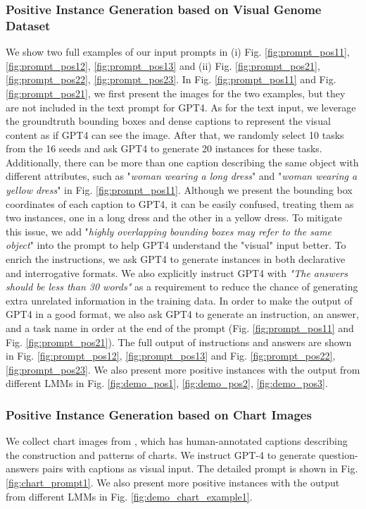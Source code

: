 \subsubsection{Positive Instance Generation based on Visual Genome Dataset}
We show two full examples of our input prompts in (i) Fig. \ref{fig:prompt_pos11}, \ref{fig:prompt_pos12}, \ref{fig:prompt_pos13} and (ii) Fig. \ref{fig:prompt_pos21}, \ref{fig:prompt_pos22}, \ref{fig:prompt_pos23}. In Fig. \ref{fig:prompt_pos11} and Fig. \ref{fig:prompt_pos21}, we first present the images for the two examples, but they are not included in the text prompt for GPT4. As for the text input, we leverage the groundtruth bounding boxes and dense captions to represent the visual content as if GPT4 can see the image. After that, we randomly select 10 tasks from the 16 seeds and ask GPT4 to generate 20 instances for these tasks. Additionally, there can be more than one caption describing the same object with different attributes, such as "\textit{woman wearing a long dress}" and "\textit{woman wearing a yellow dress}" in Fig. \ref{fig:prompt_pos11}. Although we present the bounding box coordinates of each caption to GPT4, it can be easily confused, treating them as two instances, one in a long dress and the other in a yellow dress. To mitigate this issue, we add "\textit{highly overlapping bounding boxes may refer to the same object}" into the prompt to help GPT4 understand the "visual" input better. To enrich the instructions, we ask GPT4 to generate instances in both declarative and interrogative formats. We also explicitly instruct GPT4 with \textit{"The answers should be less than 30 words"} as a requirement to reduce the chance of generating extra unrelated information in the training data. In order to make the output of GPT4 in a good format, we also ask GPT4 to generate an instruction, an answer, and a task name in order at the end of the prompt (Fig. \ref{fig:prompt_pos11} and Fig. \ref{fig:prompt_pos21}). The full output of instructions and answers are shown in Fig. \ref{fig:prompt_pos12}, \ref{fig:prompt_pos13} and Fig. \ref{fig:prompt_pos22}, \ref{fig:prompt_pos23}. We also present more positive instances with the output from different LMMs in Fig. \ref{fig:demo_pos1}, \ref{fig:demo_pos2}, \ref{fig:demo_pos3}.

\subsubsection{Positive Instance Generation based on Chart Images}
We collect chart images from \citep{tang2023vistext}, which has human-annotated captions describing the construction and patterns of charts. We instruct GPT-4 to generate question-answers pairs with captions as visual input. The detailed prompt is shown in Fig. \ref{fig:chart_prompt1}. We also present more positive instances with the output from different LMMs in Fig. \ref{fig:demo_chart_example1}.

